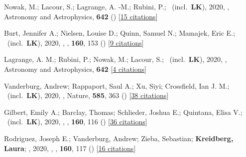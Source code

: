 \item[{\color{numcolor}\scriptsize43}] Nowak, M.; Lacour, S.; Lagrange, A. -M.; Rubini, P.; \etal\ (incl.\ \textbf{LK}), 2020, , Astronomy and Astrophysics, \textbf{642} () [\href{https://ui.adsabs.harvard.edu/abs/2020A&A...642L...2N}{15 citations}]

\item[{\color{numcolor}\scriptsize42}] Burt, Jennifer A.; Nielsen, Louise D.; Quinn, Samuel N.; Mamajek, Eric E.; \etal\ (incl.\ \textbf{LK}), 2020, , \aj, \textbf{160}, 153 () [\href{https://ui.adsabs.harvard.edu/abs/2020AJ....160..153B}{9 citations}]

\item[{\color{numcolor}\scriptsize41}] Lagrange, A. M.; Rubini, P.; Nowak, M.; Lacour, S.; \etal\ (incl.\ \textbf{LK}), 2020, , Astronomy and Astrophysics, \textbf{642} [\href{https://ui.adsabs.harvard.edu/abs/2020A&A...642A..18L}{4 citations}]

\item[{\color{numcolor}\scriptsize40}] Vanderburg, Andrew; Rappaport, Saul A.; Xu, Siyi; Crossfield, Ian J. M.; \etal\ (incl.\ \textbf{LK}), 2020, , Nature, \textbf{585}, 363 () [\href{https://ui.adsabs.harvard.edu/abs/2020Natur.585..363V}{38 citations}]

\item[{\color{numcolor}\scriptsize39}] Gilbert, Emily A.; Barclay, Thomas; Schlieder, Joshua E.; Quintana, Elisa V.; \etal\ (incl.\ \textbf{LK}), 2020, , \aj, \textbf{160}, 116 () [\href{https://ui.adsabs.harvard.edu/abs/2020AJ....160..116G}{36 citations}]

\item[{\color{numcolor}\scriptsize38}] Rodriguez, Joseph E.; Vanderburg, Andrew; Zieba, Sebastian; \textbf{Kreidberg, Laura}; \etal, 2020, , \aj, \textbf{160}, 117 () [\href{https://ui.adsabs.harvard.edu/abs/2020AJ....160..117R}{16 citations}]

